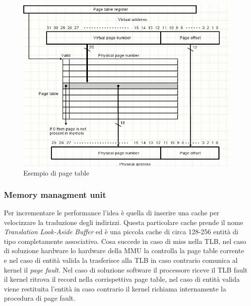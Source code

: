\begin{figure}
\centering
\includegraphics[scale=0.5]{img/pagetable.png}
\caption{Esempio di page table}\label{fig:pagetable}
\end{figure}
\subsubsection{Memory managment unit}
Per incrementare le performance l'idea è quella di inserire una cache per velocizzare la traduzione degli indirizzi. Questa particolare cache prende il nome \emph{Translation Look-Aside Buffer} ed è una piccola cache di circa 128-256 entità di tipo completamente associativo.
Cosa succede in caso di miss nella TLB, nel caso di soluzione hardware lo hardware della MMU la controlla la page table corrente e nel caso di entità valida la trasferisce alla TLB in caso contrario comunica al kernel il \emph{page fault}. Nel caso di soluzione software il processore riceve il TLB fault il kernel ritrova il record nella corrispettiva page table, nel caso di entità valida viene restituita l'entità in caso contrario il kernel richiama internamente la procedura di page fault.